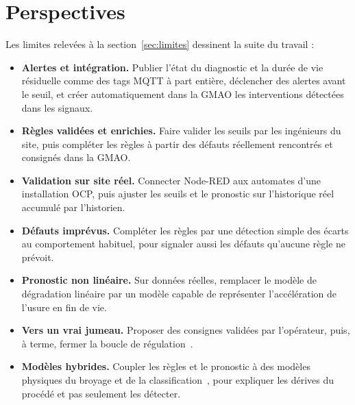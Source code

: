 \section*{Perspectives}
Les limites relevées à la section~\ref{sec:limites} dessinent la suite du travail :
\begin{itemize}
  \item \textbf{Alertes et intégration.} Publier l'état du diagnostic et la durée de vie résiduelle comme des tags MQTT à part entière, déclencher des alertes avant le seuil, et créer automatiquement dans la GMAO les interventions détectées dans les signaux.
  \item \textbf{Règles validées et enrichies.} Faire valider les seuils par les ingénieurs du site, puis compléter les règles à partir des défauts réellement rencontrés et consignés dans la GMAO.
  \item \textbf{Validation sur site réel.} Connecter Node-RED aux automates d'une installation OCP, puis ajuster les seuils et le pronostic sur l'historique réel accumulé par l'historien.
  \item \textbf{Défauts imprévus.} Compléter les règles par une détection simple des écarts au comportement habituel, pour signaler aussi les défauts qu'aucune règle ne prévoit.
  \item \textbf{Pronostic non linéaire.} Sur données réelles, remplacer le modèle de dégradation linéaire par un modèle capable de représenter l'accélération de l'usure en fin de vie.
  \item \textbf{Vers un vrai jumeau.} Proposer des consignes validées par l'opérateur, puis, à terme, fermer la boucle de régulation~\cite{kritzinger2018}.
  \item \textbf{Modèles hybrides.} Coupler les règles et le pronostic à des modèles physiques du broyage et de la classification~\cite{wills2016}, pour expliquer les dérives du procédé et pas seulement les détecter.
\end{itemize}
